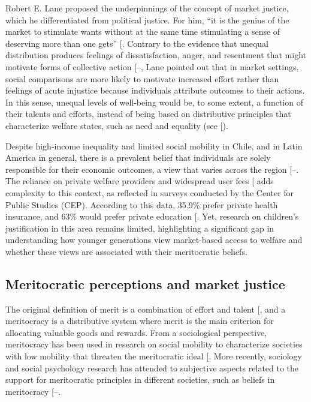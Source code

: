 \documentclass[
  12pt,
  letterpaper,
]{article}
\begin{document}
Robert E. Lane proposed the underpinnings of the concept of market
justice, which he differentiated from political justice. For him, ``it
is the genius of the market to stimulate wants without at the same time
stimulating a sense of deserving more than one gets''
{[}\citeproc{ref-lane_market_1986}{9}{]}. Contrary to the evidence that
unequal distribution produces feelings of dissatisfaction, anger, and
resentment that might motivate forms of collective action
{[}--\citeproc{ref-power_deprivationprotest_2018}{38}{]},
Lane pointed out that in market settings, social comparisons are more
likely to motivate increased effort rather than feelings of acute
injustice because individuals attribute outcomes to their actions. In
this sense, unequal levels of well-being would be, to some extent, a
function of their talents and efforts, instead of being based on
distributive principles that characterize welfare states, such as need
and equality (see {[}\citeproc{ref-wilson_role_2003}{39}{]}).

Despite high-income inequality and limited social mobility in Chile, and
in Latin America in general, there is a prevalent belief that
individuals are solely responsible for their economic outcomes, a view
that varies across the region
{[}--\citeproc{ref-salgado_inequality_2023}{43}{]}.
The reliance on private welfare providers and widespread user fees
{[}\citeproc{ref-molyneux_neoliberal_2008}{44}{]} adds complexity to
this context, as reflected in surveys conducted by the Center for Public
Studies (CEP). According to this data, 35.9\% prefer private health
insurance, and 63\% would prefer private education
{[}\citeproc{ref-centrodeestudiospublicos_estudio_2024}{45}{]}. Yet,
research on children's justification in this area remains limited,
highlighting a significant gap in understanding how younger generations
view market-based access to welfare and whether these views are
associated with their meritocratic beliefs.

\subsection{Meritocratic perceptions and market
justice}\label{meritocratic-perceptions-and-market-justice}

The original definition of merit is a combination of effort and talent
{[}\citeproc{ref-young_rise_1958}{5}{]}, and a meritocracy is a
distributive system where merit is the main criterion for allocating
valuable goods and rewards. From a sociological perspective, meritocracy
has been used in research on social mobility to characterize societies
with low mobility that threaten the meritocratic ideal
{[}\citeproc{ref-goldthorpe_myth_2003}{46}{]}. More recently, sociology
and social psychology research has attended to subjective aspects
related to the support for meritocratic principles in different
societies, such as beliefs in meritocracy
{[}--\citeproc{ref-mijs_paradox_2019}{49}{]}.
\end{document}
